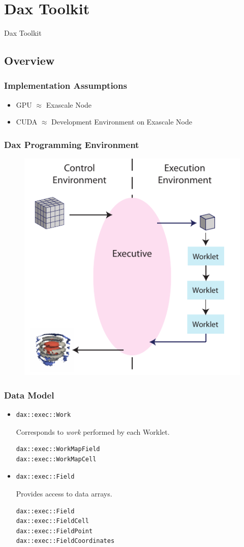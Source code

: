 \documentclass[brown]{beamer}
\newcommand\mysection[1]{
  \section{#1}
  \begin{frame}
    \begin{center}{\LARGE
      #1
      }
    \end{center}
  \end{frame}
}
\begin{document}
\mysection{Dax Toolkit}
\subsection{Overview}

\frame
{
  \frametitle{Implementation Assumptions}
  \begin{itemize}
  \addtolength{\itemsep}{2\baselineskip}
  \item GPU $\approx$ Exascale Node
  \item CUDA $\approx$ Development Environment on Exascale Node
  \end{itemize}
}

\frame
{
  \frametitle{Dax Programming Environment}
  \begin{figure}[htbp]
    \centering
    \includegraphics[width=.6\textwidth]{images/DaxDiagram}
  \end{figure}
}

\begin{frame}[fragile]
\frametitle{Data Model}

\begin{itemize}
\item %
\begin{lstlisting}[language=Dax]
dax::exec::Work
\end{lstlisting} %

Corresponds to \emph{work} performed by each Worklet. %
\begin{lstlisting}[language=Dax]
dax::exec::WorkMapField
dax::exec::WorkMapCell
\end{lstlisting}

\item %
\begin{lstlisting}[language=Dax]
dax::exec::Field
\end{lstlisting}%

Provides access to data arrays. %
\begin{lstlisting}[language=Dax]
dax::exec::Field
dax::exec::FieldCell
dax::exec::FieldPoint
dax::exec::FieldCoordinates
\end{lstlisting}
\end{itemize}
\end{frame}
\end{document}
